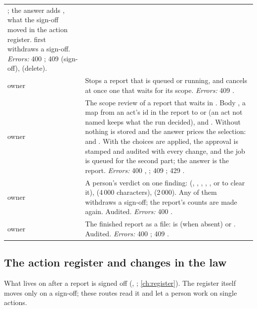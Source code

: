 \begin{xltabular}{\textwidth}{@{}L{19mm}Y@{}}
  ; the answer adds , what the sign-off moved in the action
  register.  first withdraws a sign-off. \emph{Errors:} 400
  ; 409  (sign-off),  (delete). \\
\addlinespace
{}
owner & Stops a report that is queued or running, and cancels at once one that waits for its
  scope. \emph{Errors:} 409 . \\
\addlinespace
{}
owner & The scope review of a report that waits in . Body , a
  map from an act's id in the report to  or  (an act not named keeps
  what the run decided), and . Without  nothing is stored and the
  answer prices the selection:  and . With 
  the choices are applied, the approval is stamped and audited with every change, and the job
  is queued for the second part; the answer is the report. \emph{Errors:} 400
  , ; 409 ; 429
  . \\
\addlinespace
{}
owner & A person's verdict on one finding:  (, ,
  , , , or  to clear it),
   (4\,000 characters),  (2\,000). Any of them withdraws a
  sign-off; the report's counts are made again. Audited. \emph{Errors:} 400
  . \\
\addlinespace
{}
owner & The finished report as a file:  is  (when absent) or
  . Audited. \emph{Errors:} 400 ; 409 . \\
\end{xltabular}

\subsection{The action register and changes in the law}\label{sec:api:actions}

What lives on after a report is signed off (,
; \cref{ch:register}). The register itself moves only on a sign-off;
these routes read it and let a person work on single actions.

